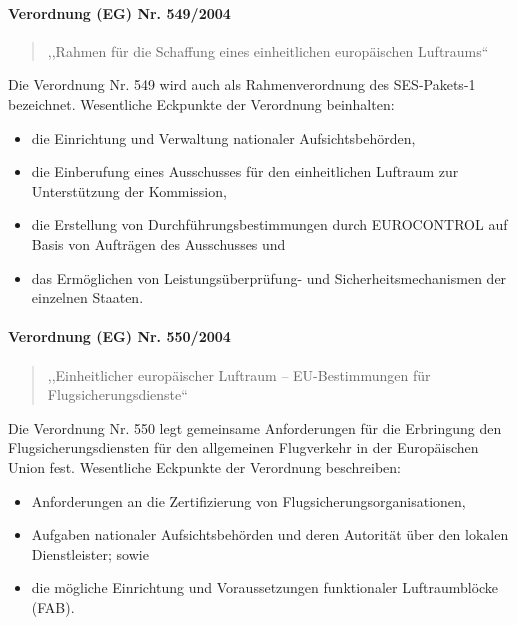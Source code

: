 
\paragraph{Verordnung (EG) Nr. 549/2004} \label{er_549}
    \begin{quote}
        ,,Rahmen für die Schaffung eines einheitlichen europäischen Luftraums``\\
        \cite{2004R0549, 2004R0549_summary}
    \end{quote}
Die Verordnung Nr. 549 wird auch als Rahmenverordnung des \ac{SES}-Pakets-1 bezeichnet.
Wesentliche Eckpunkte der Verordnung beinhalten:
    \begin{itemize}
        \item die Einrichtung und Verwaltung nationaler Aufsichtsbehörden,
        \item die Einberufung eines Ausschusses für den einheitlichen Luftraum zur Unterstützung der Kommission,
        \item die Erstellung von Durchführungsbestimmungen durch EUROCONTROL auf Basis von Aufträgen des Ausschusses und
        \item    das Ermöglichen von Leistungsüberprüfung- und Sicherheitsmechanismen der einzelnen Staaten. \cite{2004R0549_summary}
    \end{itemize}

\pagebreak
        
\paragraph{Verordnung (EG) Nr. 550/2004} \label{er_550}
\begin{quote}
    ,,Einheitlicher europäischer Luftraum – EU-Bestimmungen für Flugsicherungsdienste`` 
    \cite{2004R0550, 2004R0550_summary}
\end{quote}
    Die Verordnung Nr. 550 legt gemeinsame Anforderungen für die Erbringung den Flugsicherungsdiensten für den allgemeinen Flugverkehr in der Europäischen Union fest. 
Wesentliche Eckpunkte der Verordnung beschreiben:
    \begin{itemize}
        \item Anforderungen an die Zertifizierung von Flugsicherungsorganisationen,
        \item Aufgaben nationaler Aufsichtsbehörden und deren Autorität über den lokalen Dienstleister; sowie
        \item die mögliche Einrichtung und Voraussetzungen funktionaler Luftraumblöcke (\acs{FAB}). \cite{2004R0550_summary}
    \end{itemize}

